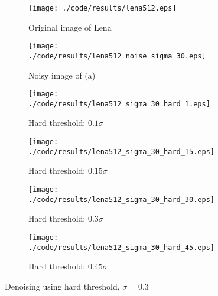 \documentclass[journal,comsoc]{IEEEtran}
\begin{document}
\begin{figure}[!hbt]
  \centering
  \begin{subfigure}{.25\textwidth}
    \centering
    \texttt{[image: ./code/results/lena512.eps]}
    \caption{Original image of Lena}
    \label{subfig:original-image-of-lena}
  \end{subfigure}%
  \begin{subfigure}{.25\textwidth}
    \centering
    \texttt{[image: ./code/results/lena512\_noise\_sigma\_30.eps]}
    \caption{Noisy image of (a)}
    \label{subfig:sigma-10-noisy-image-of-a}
  \end{subfigure}

  \begin{subfigure}{0.25\textwidth}
    \centering{}
    \texttt{[image: ./code/results/lena512\_sigma\_30\_hard\_1.eps]}
    \caption{Hard threshold: $0.1\sigma$}
  \end{subfigure}%
  \begin{subfigure}{.25\textwidth}
    \centering{}
    \texttt{[image: ./code/results/lena512\_sigma\_30\_hard\_15.eps]}
    \caption{Hard threshold: $0.15\sigma$}
  \end{subfigure}

  \begin{subfigure}{0.25\textwidth}
    \centering{}
    \texttt{[image: ./code/results/lena512\_sigma\_30\_hard\_30.eps]}
    \caption{Hard threshold: $0.3\sigma$}
  \end{subfigure}%
  \begin{subfigure}{.25\textwidth}
    \centering{}
    \texttt{[image: ./code/results/lena512\_sigma\_30\_hard\_45.eps]}
    \caption{Hard threshold: $0.45\sigma$}
  \end{subfigure}
  
  \caption{Denoising using hard threshold, $\sigma=0.3$}
  \label{fig:sigma-30-hard-threshold}
\end{figure}
\end{document}
